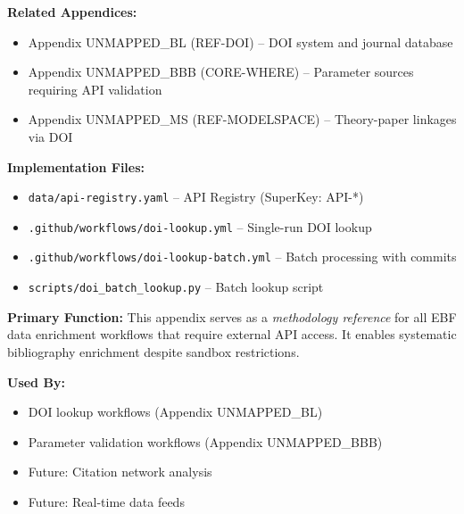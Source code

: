 \begin{tcolorbox}[colback=gray!5, colframe=gray!50, title=Cross-Reference Map]
\small
\textbf{Related Appendices:}
\begin{itemize}[noitemsep]
    \item Appendix UNMAPPED_BL (REF-DOI) -- DOI system and journal database
    \item Appendix UNMAPPED_BBB (CORE-WHERE) -- Parameter sources requiring API validation
    \item Appendix UNMAPPED_MS (REF-MODELSPACE) -- Theory-paper linkages via DOI
\end{itemize}

\textbf{Implementation Files:}
\begin{itemize}[noitemsep]
    \item \texttt{data/api-registry.yaml} -- API Registry (SuperKey: API-*)
    \item \texttt{.github/workflows/doi-lookup.yml} -- Single-run DOI lookup
    \item \texttt{.github/workflows/doi-lookup-batch.yml} -- Batch processing with commits
    \item \texttt{scripts/doi\_batch\_lookup.py} -- Batch lookup script
\end{itemize}
\end{tcolorbox}

\begin{tcolorbox}[colback=blue!5, colframe=blue!50, title=Chapter Linkage]
\small
\textbf{Primary Function:} This appendix serves as a \emph{methodology reference} for all EBF data enrichment workflows that require external API access. It enables systematic bibliography enrichment despite sandbox restrictions.

\textbf{Used By:}
\begin{itemize}[noitemsep]
    \item DOI lookup workflows (Appendix UNMAPPED_BL)
    \item Parameter validation workflows (Appendix UNMAPPED_BBB)
    \item Future: Citation network analysis
    \item Future: Real-time data feeds
\end{itemize}
\end{tcolorbox}

